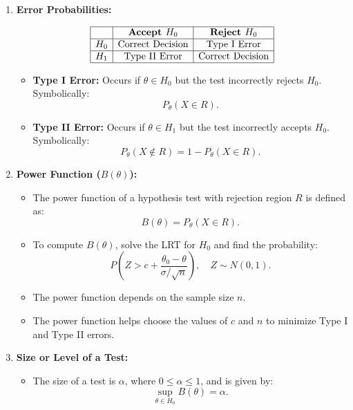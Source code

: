 \documentclass{article}
\begin{document}
\begin{enumerate}
    \item \textbf{Error Probabilities:}
    
    \[
    \begin{array}{|c|c|c|}
    \hline
     & \textbf{Accept \( H_0 \)} & \textbf{Reject \( H_0 \)} \\ \hline
    \textbf{\( H_0 \)} & \text{Correct Decision} & \text{Type I Error} \\ \hline
    \textbf{\( H_1 \)} & \text{Type II Error} & \text{Correct Decision} \\ \hline
    \end{array}
    \]
    
    \begin{itemize}
        \item \textbf{Type I Error:} Occurs if \(\theta \in H_0\) but the test incorrectly rejects \(H_0\). Symbolically:
        \[
        P_\theta(X \in R).
        \]
        \item \textbf{Type II Error:} Occurs if \(\theta \in H_1\) but the test incorrectly accepts \(H_0\). Symbolically:
        \[
        P_\theta(X \notin R) = 1 - P_\theta(X \in R).
        \]
    \end{itemize}

    \item \textbf{Power Function (\(B(\theta)\)):}
    \begin{itemize}
        \item The power function of a hypothesis test with rejection region \(R\) is defined as:
        \[
        B(\theta) = P_\theta(X \in R).
        \]
        \item To compute \(B(\theta)\), solve the LRT for \(H_0\) and find the probability:
        \[
        P\left(Z > c + \frac{\theta_0 - \theta}{\sigma/\sqrt{n}}\right), \quad Z \sim N(0,1).
        \]
        \item The power function depends on the sample size \(n\).
        \item The power function helps choose the values of \(c\) and \(n\) to minimize Type I and Type II errors.
    \end{itemize}

    \item \textbf{Size or Level of a Test:}
    \begin{itemize}
        \item The size of a test is \(\alpha\), where \(0 \leq \alpha \leq 1\), and is given by:
        \[
        \sup_{\theta \in H_0} B(\theta) = \alpha.
        \]
    \end{itemize}


\end{enumerate}
\end{document}
